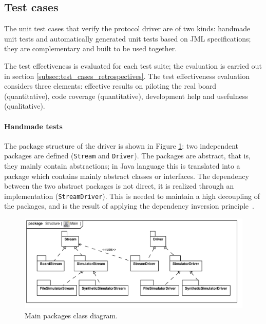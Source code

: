 \documentclass{article}
\newcommand{\lil}[1]{\texttt{\lstinline|#1|}}
\begin{document}
\subsection{Test cases}
\label{subsec:test_cases}

The unit test cases that verify the protocol driver are of two kinds: handmade unit tests and automatically generated unit tests based on JML specifications; they are complementary and built to be used together.  

The test effectiveness is evaluated for each test suite; the evaluation is carried out in section \ref{subsec:test_cases_retrospectives}.
The test effectiveness evaluation considers three elements: effective results on piloting the real board (quantitative), code coverage
(quantitative), development help and usefulness (qualitative).

\paragraph*{Handmade tests}

The package structure of the driver is shown in Figure \ref{fig:class_diagram_main}: two independent packages are defined (\lil{Stream} and \lil{Driver}).  
The packages are abstract, that is, they mainly contain abstractions; in Java language this is translated into a package which contains mainly abstract classes or interfaces.  
The dependency between the two abstract packages is not direct, it is realized through an implementation (\lil{StreamDriver}).
This is needed to maintain a high decoupling of the packages, and is the result of applying the dependency inversion principle~\cite{Martin1996}.

\begin{figure}[htb!]
  \centering
  \includegraphics[scale=0.7]{UML_model/Class_Diagram__Structure__Main}
  \caption{Main packages class diagram.}
  \label{fig:class_diagram_main}
\end{figure}
\end{document}
